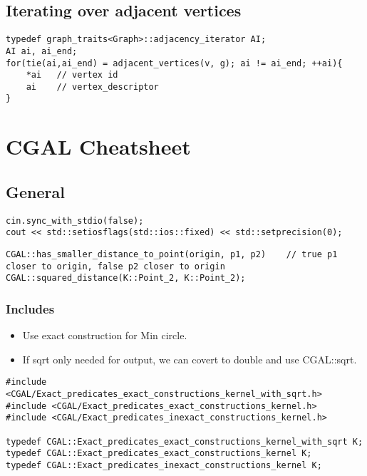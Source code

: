 \documentclass[11pt]{article}
\let\stdsection\section
\renewcommand\section{\newpage\stdsection}
\begin{document}
\subsection{Iterating over adjacent vertices}
\begin{lstlisting}
typedef graph_traits<Graph>::adjacency_iterator AI;
AI ai, ai_end;
for(tie(ai,ai_end) = adjacent_vertices(v, g); ai != ai_end; ++ai){
    *ai   // vertex id
    ai    // vertex_descriptor
}
\end{lstlisting}



\section{CGAL Cheatsheet}

\subsection{General}
\begin{lstlisting}
cin.sync_with_stdio(false);
cout << std::setiosflags(std::ios::fixed) << std::setprecision(0);
\end{lstlisting}

\begin{lstlisting}
CGAL::has_smaller_distance_to_point(origin, p1, p2)    // true p1 closer to origin, false p2 closer to origin 
CGAL::squared_distance(K::Point_2, K::Point_2);
\end{lstlisting}

\subsubsection{Includes}
\begin{itemize}
  \item Use exact construction for Min circle.
  \item If sqrt only needed for output, we can covert to double and use CGAL::sqrt.
\end{itemize}

\begin{lstlisting}
#include <CGAL/Exact_predicates_exact_constructions_kernel_with_sqrt.h>
#include <CGAL/Exact_predicates_exact_constructions_kernel.h>
#include <CGAL/Exact_predicates_inexact_constructions_kernel.h>

typedef CGAL::Exact_predicates_exact_constructions_kernel_with_sqrt K;
typedef CGAL::Exact_predicates_exact_constructions_kernel K;
typedef CGAL::Exact_predicates_inexact_constructions_kernel K;
\end{lstlisting}
\end{document}
